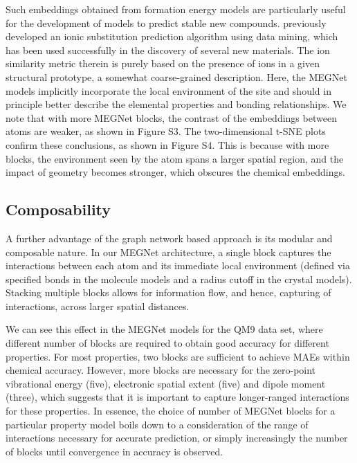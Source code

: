 \documentclass[manuscript=article]{achemso}
\begin{document}
Such embeddings obtained from formation energy models are particularly useful for the development of models to predict stable new compounds. \citet{Hautier2010a} previously developed an ionic substitution prediction algorithm using data mining, which has been used successfully in the discovery of several new materials\cite{hautier2011novel, wang2018mining}. The ion similarity metric therein is purely based on the presence of ions in a given structural prototype, a somewhat coarse-grained description. Here, the MEGNet models implicitly incorporate the local environment of the site and should in principle better describe the elemental properties and bonding relationships. We note that with more MEGNet blocks, the contrast of the embeddings between atoms are weaker, as shown in Figure S3. The two-dimensional t-SNE plots\cite{Maaten2008} confirm these conclusions, as shown in Figure S4. This is because with more blocks, the environment seen by the atom spans a larger spatial region, and the impact of geometry becomes stronger, which obscures the chemical embeddings.

\subsection{Composability}

A further advantage of the graph network based approach is its modular and composable nature. In our MEGNet architecture, a single block captures the interactions between each atom and its immediate local environment (defined via specified bonds in the molecule models and a radius cutoff in the crystal models). Stacking multiple blocks allows for information flow, and hence, capturing of interactions, across larger spatial distances.

We can see this effect in the MEGNet models for the QM9 data set, where different number of blocks are required to obtain good accuracy for different properties. For most properties, two blocks are sufficient to achieve MAEs within chemical accuracy. However, more blocks are necessary for the zero-point vibrational energy (five), electronic spatial extent (five) and dipole moment (three), which suggests that it is important to capture longer-ranged interactions for these properties. In essence, the choice of number of MEGNet blocks for a particular property model boils down to a consideration of the range of interactions necessary for accurate prediction, or simply increasingly the number of blocks until convergence in accuracy is observed.
\end{document}
